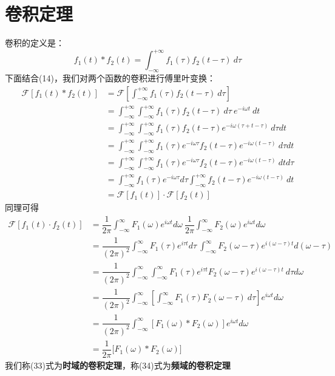 \documentclass[UTF8]{ctexbook}
\begin{document}
		\section{卷积定理}
			卷积的定义是：
			\begin{equation}
				f_1(t)*f_2(t) = \int_{-\infty}^{+\infty}f_1(\tau)f_2(t - \tau)\ d\tau
			\end{equation}
			下面结合(14)，我们对两个函数的卷积进行傅里叶变换：
			\begin{equation}
				\begin{split}
				\mathscr{F}[f_1(t)*f_2(t)] &= \mathscr{F}[\int_{-\infty}^{+\infty}f_1(\tau)f_2(t - \tau)\ d\tau]\\
				&= \int_{-\infty}^{+\infty}\int_{-\infty}^{+\infty}f_1(\tau)f_2(t - \tau)\ d\tau\ e^{-i\omega t}\ dt\\
				&= \int_{-\infty}^{+\infty}\int_{-\infty}^{+\infty}f_1(\tau)f_2(t - \tau)e^{-i\omega (\tau + t -\tau)}\ d\tau dt\\
				&= \int_{-\infty}^{+\infty}\int_{-\infty}^{+\infty}f_1(\tau)e^{-i\omega \tau}f_2(t - \tau)e^{-i\omega (t - \tau)}\ d\tau dt\\
				&= \int_{-\infty}^{+\infty}\int_{-\infty}^{+\infty}f_1(\tau)e^{-i\omega \tau}f_2(t - \tau)e^{-i\omega (t - \tau)}\ dt d\tau\\
				&= \int_{-\infty}^{+\infty}f_1(\tau)e^{-i\omega \tau}d\tau\int_{-\infty}^{+\infty}f_2(t - \tau)e^{-i\omega (t - \tau)}\ dt\\
				&= \mathscr{F}[f_1(t)]\cdot\mathscr{F}[f_2(t)]
				\end{split}
			\end{equation}
			同理可得
			\begin{equation}
				\begin{split}
					\mathscr{F}[f_1(t)\cdot f_2(t)] &= \dfrac{1}{2\pi}\int_{-\infty}^{\infty}F_1(\omega) e^{i\omega t} d\omega\ \dfrac{1}{2\pi}\int_{-\infty}^{\infty}F_2(\omega) e^{i\omega t} d\omega\\
					&= \dfrac{1}{(2\pi)^2}\int_{-\infty}^{\infty}F_1(\tau) e^{i\tau t} d\tau\ \int_{-\infty}^{\infty}F_2(\omega - \tau) e^{i(\omega - \tau) t} d(\omega - \tau)\\
					&= \dfrac{1}{(2\pi)^2}\int_{-\infty}^{\infty}\int_{-\infty}^{\infty}F_1(\tau) e^{i\tau t} F_2(\omega - \tau) e^{i(\omega - \tau) t}\ d\tau d\omega\\
					&= \dfrac{1}{(2\pi)^2}\int_{-\infty}^{\infty}\left[\int_{-\infty}^{\infty}F_1(\tau) F_2(\omega - \tau)\ d\tau\right]e^{i\omega t}d\omega\\
					&= \dfrac{1}{(2\pi)^2}\int_{-\infty}^{\infty}\left[F_1(\omega)*F_2(\omega)\right]e^{i\omega t}d\omega\\
					&= \dfrac{1}{2\pi}\mathscr[F_1(\omega)*F_2(\omega)]
				\end{split}
			\end{equation}
			我们称(33)式为\textbf{时域的卷积定理}，称(34)式为\textbf{频域的卷积定理}
\end{document}
